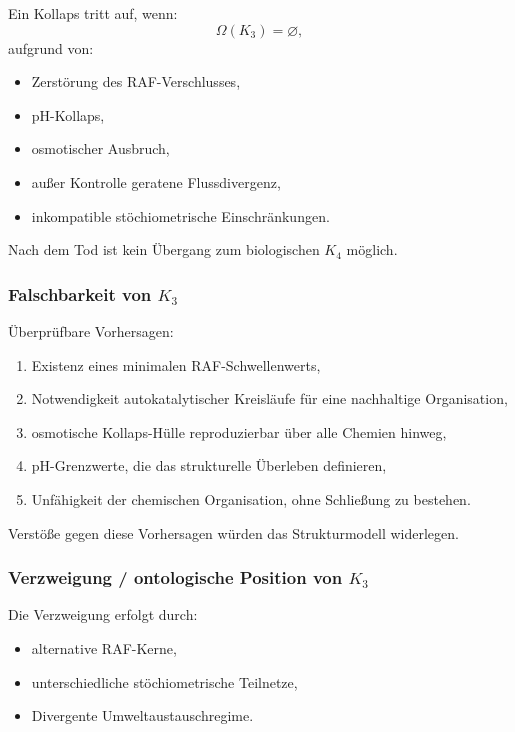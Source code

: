 Ein Kollaps tritt auf, wenn:
\[
\Omega(K_3) = \varnothing,
\]
aufgrund von:
\begin{itemize}
    \item Zerstörung des RAF-Verschlusses,
    \item pH-Kollaps,
    \item osmotischer Ausbruch,
    \item außer Kontrolle geratene Flussdivergenz,
    \item inkompatible stöchiometrische Einschränkungen.
\end{itemize}

Nach dem Tod ist kein Übergang zum biologischen $K_4$ möglich.

\subsubsection{Falschbarkeit von \texorpdfstring{$K_3$}{K_3}}

Überprüfbare Vorhersagen:
\begin{enumerate}
    \item Existenz eines minimalen RAF-Schwellenwerts,
    \item Notwendigkeit autokatalytischer Kreisläufe für eine nachhaltige Organisation,
    \item osmotische Kollaps-Hülle reproduzierbar über alle Chemien hinweg,
    \item pH-Grenzwerte, die das strukturelle Überleben definieren,
    \item Unfähigkeit der chemischen Organisation, ohne Schließung zu bestehen.
\end{enumerate}

Verstöße gegen diese Vorhersagen würden das Strukturmodell widerlegen.

\subsubsection{Verzweigung / ontologische Position von \texorpdfstring{$K_3$}{K_3}}

Die Verzweigung erfolgt durch:
\begin{itemize}
    \item alternative RAF-Kerne,
    \item unterschiedliche stöchiometrische Teilnetze,
    \item Divergente Umweltaustauschregime.
\end{itemize}

